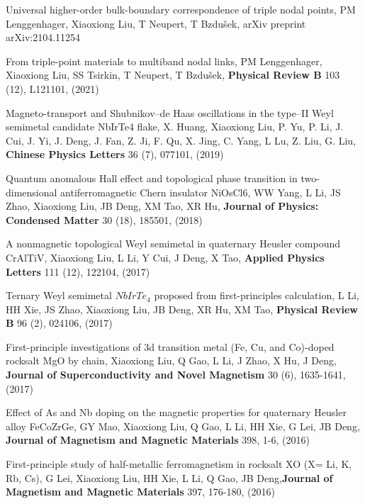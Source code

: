 \documentclass[11pt,a4paper,sans]{moderncv} %
\begin{document}
\begin{etaremune}
  \item Universal higher-order bulk-boundary correspondence of triple nodal points, PM Lenggenhager, \textcolor{cvblue}{Xiaoxiong Liu}, T Neupert, T Bzdušek, arXiv preprint arXiv:2104.11254
  \item From triple-point materials to multiband nodal links, PM Lenggenhager, \textcolor{cvblue}{Xiaoxiong Liu}, SS Tsirkin, T Neupert, T Bzdušek, \textbf{Physical Review B} 103 (12), L121101, (2021)
  \item Magneto-transport and Shubnikov–de Haas oscillations in the type–II Weyl semimetal candidate NbIrTe4 flake, X. Huang, \textcolor{cvblue}{Xiaoxiong Liu}, P. Yu, P. Li, J. Cui, J. Yi, J. Deng, J. Fan, Z. Ji, F. Qu, X. Jing, C. Yang, L Lu, Z. Liu, G. Liu, \textbf{Chinese Physics Letters} 36 (7), 077101, (2019)
  \item Quantum anomalous Hall effect and topological phase transition in two-dimensional antiferromagnetic Chern insulator NiOsCl6, WW Yang, L Li, JS Zhao, \textcolor{cvblue}{Xiaoxiong Liu}, JB Deng, XM Tao, XR Hu, \textbf{Journal of Physics: Condensed Matter} 30 (18), 185501, (2018)
  \item A nonmagnetic topological Weyl semimetal in quaternary Heusler compound CrAlTiV, \textcolor{cvblue}{Xiaoxiong Liu}, L Li, Y Cui, J Deng, X Tao, \textbf{Applied Physics Letters} 111 (12), 122104, (2017)
  \item Ternary Weyl semimetal $NbIrTe_4$ proposed from first-principles calculation, L Li, HH Xie, JS Zhao, \textcolor{cvblue}{Xiaoxiong Liu}, JB Deng, XR Hu, XM Tao, \textbf{Physical Review B} 96 (2), 024106, (2017)
  \item First-principle investigations of 3d transition metal (Fe, Cu, and Co)-doped rocksalt MgO by chain, \textcolor{cvblue}{Xiaoxiong Liu}, Q Gao, L Li, J Zhao, X Hu, J Deng, \textbf{Journal of Superconductivity and Novel Magnetism} 30 (6), 1635-1641, (2017)
  \item Effect of As and Nb doping on the magnetic properties for quaternary Heusler alloy FeCoZrGe, GY Mao, \textcolor{cvblue}{Xiaoxiong Liu}, Q Gao, L Li, HH Xie, G Lei, JB Deng, \textbf{Journal of Magnetism and Magnetic Materials} 398, 1-6, (2016)
  \item First-principle study of half-metallic ferromagnetism in rocksalt XO (X= Li, K, Rb, Cs), G Lei, \textcolor{cvblue}{Xiaoxiong Liu}, HH Xie, L Li, Q Gao, JB Deng,\textbf{Journal of Magnetism and Magnetic Materials} 397, 176-180, (2016)

\end{etaremune}









\end{document}
